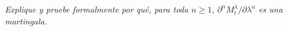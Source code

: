 \emph{
    Explique y pruebe formalmente por qu\'e, para toda 
    $n\geq 1$, $\partial^n M^\lambda_t/\partial \lambda^n$ es una martingala.\pn
}

\afterstatement\pn